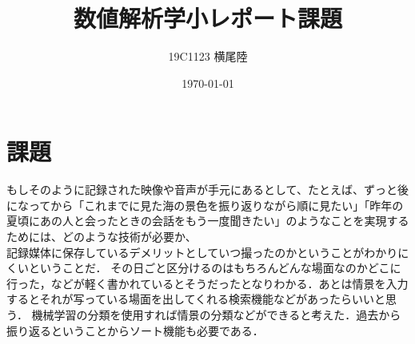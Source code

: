 \documentclass[dvipdfmx]{jsarticle}
\begin{document}
\title{数値解析学小レポート課題}
\author{19C1123 横尾陸}
\date{\today}
\maketitle

\section*{課題}
もしそのように記録された映像や音声が手元にあるとして、たとえば、ずっと後になってから「これまでに見た海の景色を振り返りながら順に見たい」「昨年の夏頃にあの人と会ったときの会話をもう一度聞きたい」のようなことを実現するためには、どのような技術が必要か、\\

記録媒体に保存しているデメリットとしていつ撮ったのかということがわかりにくいということだ．
その日ごと区分けるのはもちろんどんな場面なのかどこに行った，などが軽く書かれているとそうだったとなりわかる．あとは情景を入力するとそれが写っている場面を出してくれる検索機能などがあったらいいと思う．
機械学習の分類を使用すれば情景の分類などができると考えた．過去から振り返るということからソート機能も必要である．
\end{document}
